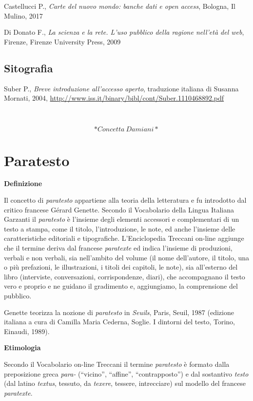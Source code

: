 \documentclass[
  b5paper,
  twoside,
  12pt,
  chapterprefix=false,
  bibliography=totocnumbered,
  parskip=false]{scrbook}
\begin{document}
Castellucci P., \emph{Carte del nuovo mondo: banche dati e open access},
Bologna, Il Mulino, 2017

Di Donato F., \emph{La scienza e la rete. L'uso pubblico della ragione
nell'età del web}, Firenze, Firenze University Press, 2009

\hypertarget{sitografia-26}{%
\section*{Sitografia}\label{sitografia-26}}

Suber P., \emph{Breve introduzione all'accesso aperto}, traduzione italiana
di Susanna Mornati, 2004,
\url{http://www.iss.it/binary/bibl/cont/Suber.1110468892.pdf}

~

\[*Concetta~Damiani*\]

\hypertarget{paratesto}{%
\chapter{Paratesto}\label{paratesto}}

\textbf{Definizione}

Il concetto di \emph{paratesto} appartiene alla teoria della letteratura e fu
introdotto dal critico francese Gérard Genette. Secondo il Vocabolario
della Lingua Italiana Garzanti il \emph{paratesto} è l'insieme degli elementi
accessori e complementari di un testo a stampa, come il titolo,
l'introduzione, le note, ed anche l'insieme delle caratteristiche
editoriali e tipografiche. L'Enciclopedia Treccani on-line aggiunge che
il termine deriva dal francese \emph{paratexte} ed indica l'insieme di
produzioni, verbali e non verbali, sia nell'ambito del volume (il nome
dell'autore, il titolo, una o più prefazioni, le illustrazioni, i titoli
dei capitoli, le note), sia all'esterno del libro (interviste,
conversazioni, corrispondenze, diari), che accompagnano il testo vero e
proprio e ne guidano il gradimento e, aggiungiamo, la comprensione del
pubblico.

Genette teorizza la nozione di \emph{paratesto} in \emph{Seuils}, Paris, Seuil,
1987 (edizione italiana a cura di Camilla Maria Cederna, Soglie. I
dintorni del testo, Torino, Einaudi, 1989).

\phantom{~}

\textbf{Etimologia}

Secondo il Vocabolario on-line Treccani il termine \emph{paratesto} è formato
dalla preposizione greca \emph{para-} (\enquote{vicino}, \enquote{affine}, \enquote{contrapposto}) e
dal sostantivo \emph{testo} (dal latino \emph{textus}, tessuto, da \emph{texere},
tessere, intrecciare) sul modello del francese \emph{paratexte}.
\end{document}
